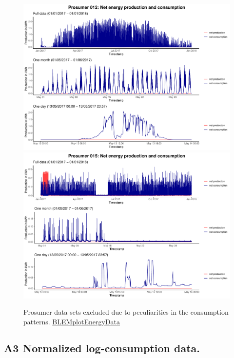 \begin{centering}
\begin{figure}[H]
        \includegraphics[width=\textwidth-0.85cm]{thesis/graphs/timeseries/p012_prod&cons.pdf}\vspace{0.3cm}
        \includegraphics[width=\textwidth-0.85cm]{thesis/graphs/timeseries/p015_prod&cons.pdf}
        \caption[Prosumer data sets excluded due to peculiarities in the consumption patterns]{Prosumer data sets excluded due to peculiarities in the consumption patterns. \quantnet\href{ }{BLEMplotEnergyData}}
        \label{App:Fig:excludedpros}
\end{figure}
\end{centering}


\subsection*{A3 Normalized log-consumption data.} \label{App:Figures:transform}

